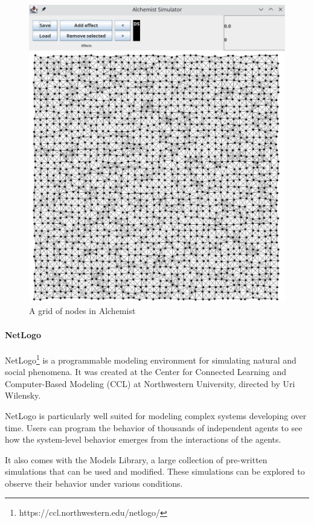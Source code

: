 \documentclass[12pt,a4paper,openright,twoside]{book}
\begin{document}
\begin{figure}[h!]
  \centering
  \includegraphics[width=\textwidth]{figures/alchemist.png}
  \caption{A grid of nodes in Alchemist}
\end{figure}

\paragraph*{NetLogo}

NetLogo\footnote{https://ccl.northwestern.edu/netlogo/} is a programmable modeling environment for simulating natural and social phenomena. It was created at the Center
for Connected Learning and Computer-Based Modeling (CCL) at Northwestern University, directed by Uri Wilensky.

NetLogo is particularly well suited for modeling complex systems developing over time.
Users can program the behavior of thousands of independent agents to see how the system-level behavior emerges from the interactions of the agents.

It also comes with the Models Library, a large collection of pre-written simulations that can be used and modified.
These simulations can be explored to observe their behavior under various conditions.
\end{document}
